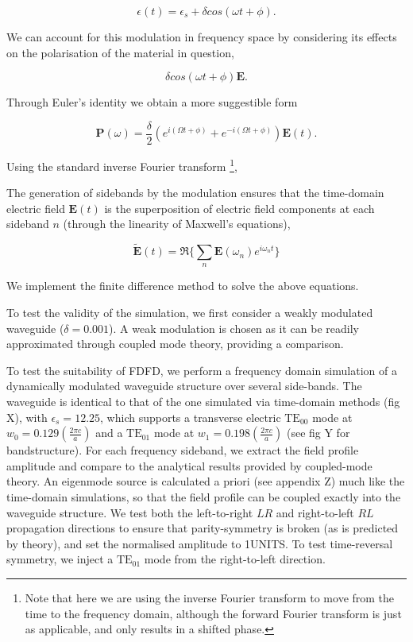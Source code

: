 \begin{equation}
\epsilon(t) = \epsilon_s + \delta cos(\omega t + \phi).
\end{equation}

We can account for this modulation in frequency space by considering its effects on the polarisation of the material in question,

\begin{equation}
	 \delta cos(\omega t + \phi) \bm{E}.
\end{equation}

Through Euler's identity we obtain a more suggestible form

\begin{equation}
\bm{P}(\omega) = \dfrac{\delta}{2} (e^{i(\Omega t + \phi)} + e^{-i(\Omega t + \phi)}) \bm{E}(t).
\end{equation}

Using the standard inverse Fourier transform \footnote{Note that here we are using the inverse Fourier transform to move from the time to the frequency domain, although the forward Fourier transform is just as applicable, and only results in a shifted phase.},

The generation of sidebands by the modulation ensures that the time-domain electric field $\bm{E}(t)$ is the superposition of electric field components at each sideband $n$ (through the linearity of Maxwell's equations),

\begin{equation}
\tilde{\bm{E}}(t) = \Re \{\sum_n \bm{E}(\omega_n)e^{i \omega_n t}\}
\end{equation}


We implement the finite difference method to solve the above equations.

To test the validity of the simulation, we first consider a weakly modulated waveguide ($\delta = 0.001$).  A weak modulation is chosen as it can be readily approximated through coupled mode theory, providing a comparison.

To test the suitability of FDFD, we perform a frequency domain simulation of a dynamically modulated waveguide structure over several side-bands. The waveguide is identical to that of the one simulated via time-domain methods (fig X), with $\epsilon_s = 12.25$, which supports a transverse electric $\text{TE}_{00}$ mode at $w_0 = 0.129 (\frac{2\pi c}{a})$ and a  $\text{TE}_{01}$ mode at $w_1 = 0.198(\frac{2\pi c}{a})$ (see fig Y for bandstructure). For each frequency sideband, we extract the field profile amplitude and compare to the analytical results provided by coupled-mode theory. An eigenmode source is calculated a priori (see appendix Z) much like the time-domain simulations, so that the field profile can be coupled exactly into the waveguide structure. We test both the left-to-right $LR$ and right-to-left $RL$ propagation directions to ensure that parity-symmetry is broken (as is predicted by theory), and set the normalised amplitude to 1UNITS. To test time-reversal symmetry, we inject a $\text{TE}_{01}$ mode from the right-to-left direction.

